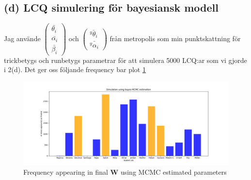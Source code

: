 \documentclass{assignment}
\begin{document}
\subsection*{(d) LCQ simulering för bayesiansk modell}
Jag använde $\begin{pmatrix} \bar{\theta_i} \\ \bar{\alpha_i} \\ \bar{\beta_i} \end{pmatrix}$ och
$\begin{pmatrix} \bar{^y\theta_i} \\ \bar{^y\alpha_i}\end{pmatrix}$ 
från metropolis som min punktskattning för trickbetygs och runbetygs parametrar för att simulera 5000 LCQ:ar som vi 
gjorde i 2(d).
Det ger oss följande frequency bar plot \cref{MCMC freq bar} 
\begin{figure}
    \includegraphics[width=200mm]{assets/MCMCsim.png}
    \caption{Frequency appearing in final \textbf{W} using MCMC estimated parameters}
    \label{MCMC freq bar}
\end{figure}
\end{document}
